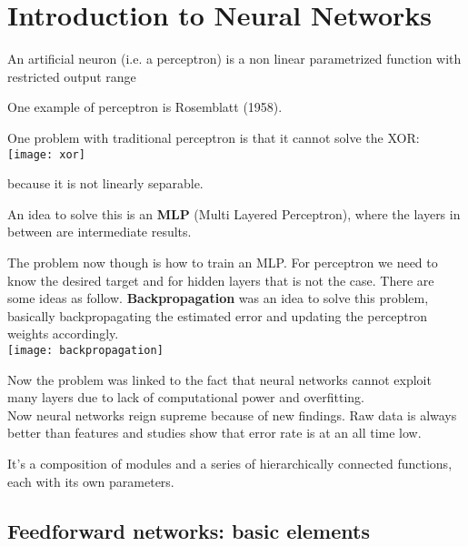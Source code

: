 \chapter{Introduction to Neural Networks}
\begin{definition}
	An artificial neuron (i.e. a perceptron) is a non linear parametrized function with restricted output range
\end{definition}

One example of perceptron is Rosemblatt (1958).

One problem with traditional perceptron is that it cannot solve the XOR: 
\texttt{[image: xor]}

because it is not linearly separable.

An idea to solve this is an {\bf MLP} (Multi Layered Perceptron), where the layers in between are intermediate results.

The problem now though is how to train an MLP. For perceptron we need to know the desired target and for hidden layers that is not the case. There are some ideas as follow. 
\newpage
{\bf Backpropagation}  was an idea to solve this problem, basically backpropagating the estimated error and updating the perceptron weights accordingly. \\
\texttt{[image: backpropagation]}

Now the problem was linked to the fact that neural networks cannot exploit many layers due to lack of computational power and overfitting. \\
Now neural networks reign supreme because of new findings. Raw data is always better than features and studies show that error rate is at an all time low. 

\begin{definition}
	It's a composition of modules and a series of hierarchically connected functions, each with its own parameters.
\end{definition}

\section{Feedforward networks: basic elements}

